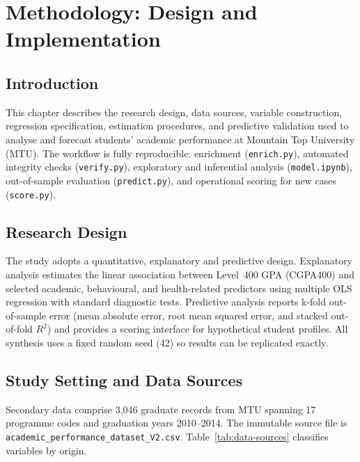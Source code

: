 \documentclass[12pt]{report}
\begin{document}
	\chapter{Methodology: Design and Implementation}
	
	\section{Introduction}
	This chapter describes the research design, data sources, variable construction, regression specification, estimation procedures, and predictive validation used to analyse and forecast students' academic performance at Mountain Top University (MTU). The workflow is fully reproducible: enrichment (\texttt{enrich.py}), automated integrity checks (\texttt{verify.py}), exploratory and inferential analysis (\texttt{model.ipynb}), out-of-sample evaluation (\texttt{predict.py}), and operational scoring for new cases (\texttt{score.py}).
	
	\section{Research Design}
	The study adopts a quantitative, explanatory and predictive design. Explanatory analysis estimates the linear association between Level~400 GPA (CGPA400) and selected academic, behavioural, and health-related predictors using multiple OLS regression with standard diagnostic tests. Predictive analysis reports k-fold out-of-sample error (mean absolute error, root mean squared error, and stacked out-of-fold $R^2$) and provides a scoring interface for hypothetical student profiles. All synthesis uses a fixed random seed (42) so results can be replicated exactly.
	
	\section{Study Setting and Data Sources}
	Secondary data comprise 3,046 graduate records from MTU spanning 17 programme codes and graduation years 2010--2014. The immutable source file is \texttt{academic\_performance\_dataset\_V2.csv}. Table~\ref{tab:data-sources} classifies variables by origin.
	
\end{document}

